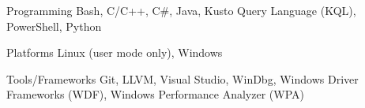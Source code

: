 
\begin{cvskills}

  \cvskill
    {Programming} %
    {
      Bash,
      C/C++,
      C\#,
      Java,
      Kusto Query Language (KQL),
      PowerShell,
      Python
    } %

  \cvskill
    {Platforms} %
    {
      Linux (user mode only),
      Windows
    } %

  \cvskill
    {Tools/Frameworks} %
    {
      Git,
      LLVM,
      Visual Studio,
      WinDbg,
      Windows Driver Frameworks (WDF),
      Windows Performance Analyzer (WPA)
    } %

\end{cvskills}

